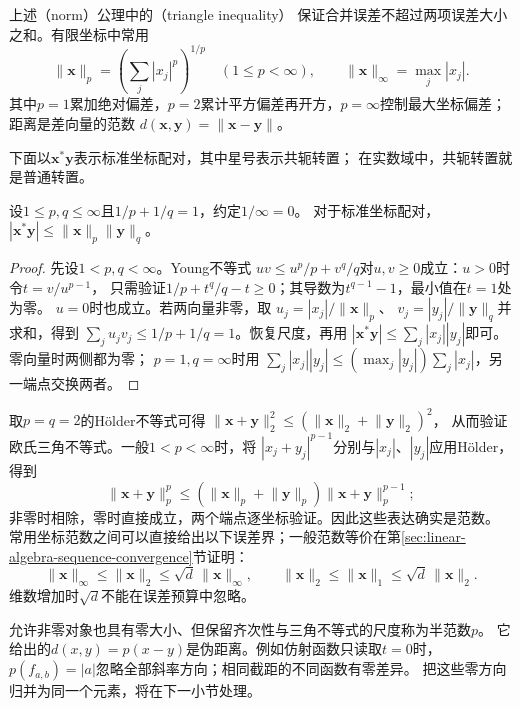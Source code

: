 上述（norm）公理中的（triangle inequality）
保证合并误差不超过两项误差大小之和。有限坐标中常用
\[
 \lVert\bm x\rVert_p=\left(\sum_j|x_j|^p\right)^{1/p}
 \quad(1\leq p<\infty),\qquad
 \lVert\bm x\rVert_\infty=\max_j|x_j|.
\]
其中$p=1$累加绝对偏差，$p=2$累计平方偏差再开方，$p=\infty$控制最大坐标偏差；距离是差向量的范数
$d(\bm x,\bm y)=\lVert\bm x-\bm y\rVert$。

下面以$\bm x^*\bm y$表示标准坐标配对，其中星号表示共轭转置；
在实数域中，共轭转置就是普通转置。

\begin{theorem}[有限维Hölder不等式]
\label{thm:linear-algebra-holder}
设$1\leq p,q\leq\infty$且$1/p+1/q=1$，约定$1/\infty=0$。
对于标准坐标配对，
$|\bm x^*\bm y|\leq\lVert\bm x\rVert_p\lVert\bm y\rVert_q$。
\end{theorem}
\begin{proof}
先设$1<p,q<\infty$。Young不等式
$uv\leq u^p/p+v^q/q$对$u,v\geq0$成立：$u>0$时令$t=v/u^{p-1}$，
只需验证$1/p+t^q/q-t\geq0$；其导数为$t^{q-1}-1$，最小值在$t=1$处为零。
$u=0$时也成立。若两向量非零，取
$u_j=|x_j|/\lVert\bm x\rVert_p$、
$v_j=|y_j|/\lVert\bm y\rVert_q$并求和，得到
$\sum_j u_jv_j\leq1/p+1/q=1$。恢复尺度，再用
$|\bm x^*\bm y|\leq\sum_j|x_j||y_j|$即可。零向量时两侧都为零；
$p=1,q=\infty$时用
$\sum_j|x_j||y_j|\leq(\max_j|y_j|)\sum_j|x_j|$，另一端点交换两者。
\end{proof}

取$p=q=2$的Hölder不等式可得
$\lVert\bm x+\bm y\rVert_2^2\leq(\lVert\bm x\rVert_2+\lVert\bm y\rVert_2)^2$，
从而验证欧氏三角不等式。一般$1<p<\infty$时，将
$|x_j+y_j|^{p-1}$分别与$|x_j|$、$|y_j|$应用Hölder，得到
\[
 \lVert\bm x+\bm y\rVert_p^p
 \leq(\lVert\bm x\rVert_p+\lVert\bm y\rVert_p)
      \lVert\bm x+\bm y\rVert_p^{p-1};
\]
非零时相除，零时直接成立，两个端点逐坐标验证。因此这些表达确实是范数。
常用坐标范数之间可以直接给出以下误差界；一般范数等价在第\ref{sec:linear-algebra-sequence-convergence}节证明：
\[
 \lVert\bm x\rVert_\infty\leq\lVert\bm x\rVert_2
 \leq\sqrt d\,\lVert\bm x\rVert_\infty,\qquad
 \lVert\bm x\rVert_2\leq\lVert\bm x\rVert_1
 \leq\sqrt d\,\lVert\bm x\rVert_2.
\]
维数增加时$\sqrt d$不能在误差预算中忽略。


允许非零对象也具有零大小、但保留齐次性与三角不等式的尺度称为半范数$p$。
它给出的$d(x,y)=p(x-y)$是伪距离。例如仿射函数只读取$t=0$时，
$p(f_{a,b})=|a|$忽略全部斜率方向；相同截距的不同函数有零差异。
把这些零方向归并为同一个元素，将在下一小节处理。

